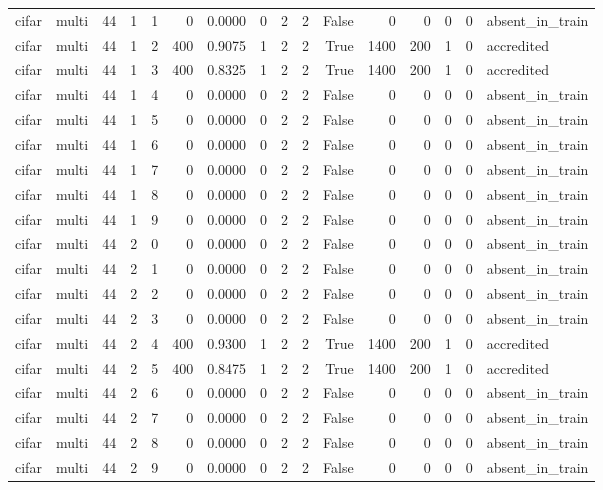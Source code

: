 \begin{tabular}{llrrrrrrrrrrrrrl}
cifar & multi & 44 & 1 & 1 & 0 & 0.0000 & 0 & 2 & 2 & False & 0 & 0 & 0 & 0 & absent\_in\_train \\
cifar & multi & 44 & 1 & 2 & 400 & 0.9075 & 1 & 2 & 2 & True & 1400 & 200 & 1 & 0 & accredited \\
cifar & multi & 44 & 1 & 3 & 400 & 0.8325 & 1 & 2 & 2 & True & 1400 & 200 & 1 & 0 & accredited \\
cifar & multi & 44 & 1 & 4 & 0 & 0.0000 & 0 & 2 & 2 & False & 0 & 0 & 0 & 0 & absent\_in\_train \\
cifar & multi & 44 & 1 & 5 & 0 & 0.0000 & 0 & 2 & 2 & False & 0 & 0 & 0 & 0 & absent\_in\_train \\
cifar & multi & 44 & 1 & 6 & 0 & 0.0000 & 0 & 2 & 2 & False & 0 & 0 & 0 & 0 & absent\_in\_train \\
cifar & multi & 44 & 1 & 7 & 0 & 0.0000 & 0 & 2 & 2 & False & 0 & 0 & 0 & 0 & absent\_in\_train \\
cifar & multi & 44 & 1 & 8 & 0 & 0.0000 & 0 & 2 & 2 & False & 0 & 0 & 0 & 0 & absent\_in\_train \\
cifar & multi & 44 & 1 & 9 & 0 & 0.0000 & 0 & 2 & 2 & False & 0 & 0 & 0 & 0 & absent\_in\_train \\
cifar & multi & 44 & 2 & 0 & 0 & 0.0000 & 0 & 2 & 2 & False & 0 & 0 & 0 & 0 & absent\_in\_train \\
cifar & multi & 44 & 2 & 1 & 0 & 0.0000 & 0 & 2 & 2 & False & 0 & 0 & 0 & 0 & absent\_in\_train \\
cifar & multi & 44 & 2 & 2 & 0 & 0.0000 & 0 & 2 & 2 & False & 0 & 0 & 0 & 0 & absent\_in\_train \\
cifar & multi & 44 & 2 & 3 & 0 & 0.0000 & 0 & 2 & 2 & False & 0 & 0 & 0 & 0 & absent\_in\_train \\
cifar & multi & 44 & 2 & 4 & 400 & 0.9300 & 1 & 2 & 2 & True & 1400 & 200 & 1 & 0 & accredited \\
cifar & multi & 44 & 2 & 5 & 400 & 0.8475 & 1 & 2 & 2 & True & 1400 & 200 & 1 & 0 & accredited \\
cifar & multi & 44 & 2 & 6 & 0 & 0.0000 & 0 & 2 & 2 & False & 0 & 0 & 0 & 0 & absent\_in\_train \\
cifar & multi & 44 & 2 & 7 & 0 & 0.0000 & 0 & 2 & 2 & False & 0 & 0 & 0 & 0 & absent\_in\_train \\
cifar & multi & 44 & 2 & 8 & 0 & 0.0000 & 0 & 2 & 2 & False & 0 & 0 & 0 & 0 & absent\_in\_train \\
cifar & multi & 44 & 2 & 9 & 0 & 0.0000 & 0 & 2 & 2 & False & 0 & 0 & 0 & 0 & absent\_in\_train \\

\end{tabular}
